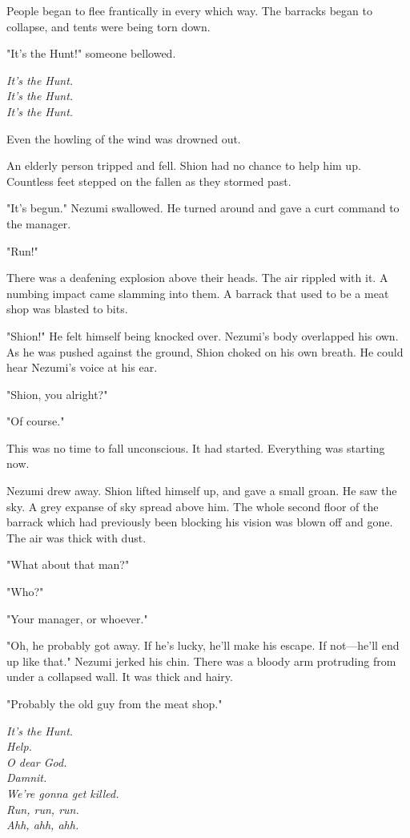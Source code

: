 People began to flee frantically in every which way. The barracks began
to collapse, and tents were being torn down.

"It's the Hunt!" someone bellowed.

\myspace

\emph{It's the Hunt.\\
It's the Hunt.\\
It's the Hunt.}

\myspace

Even the howling of the wind was drowned out.

An elderly person tripped and fell. Shion had no chance to help him up.
Countless feet stepped on the fallen as they stormed past.

"It's begun." Nezumi swallowed. He turned around and gave a curt command
to the manager.

"Run!"

There was a deafening explosion above their heads. The air rippled with
it. A numbing impact came slamming into them. A barrack that used to be
a meat shop was blasted to bits.

"Shion!" He felt himself being knocked over. Nezumi's body overlapped
his own. As he was pushed against the ground, Shion choked on his own
breath. He could hear Nezumi's voice at his ear.

"Shion, you alright?"

"Of course."

This was no time to fall unconscious. It had started. Everything was
starting now.

Nezumi drew away. Shion lifted himself up, and gave a small groan. He
saw the sky. A grey expanse of sky spread above him. The whole second
floor of the barrack which had previously been blocking his vision was
blown off and gone. The air was thick with dust.

"What about that man?"

"Who?"

"Your manager, or whoever."

"Oh, he probably got away. If he's lucky, he'll make his escape. If
not---he'll end up like that." Nezumi jerked his chin. There was a bloody
arm protruding from under a collapsed wall. It was thick and hairy.

"Probably the old guy from the meat shop."

\myspace

\emph{It's the Hunt.\\
	Help.\\
	O dear God.\\
	Damnit.\\
	We're gonna get killed.\\
	Run, run, run.\\
	Ahh, ahh, ahh.}


